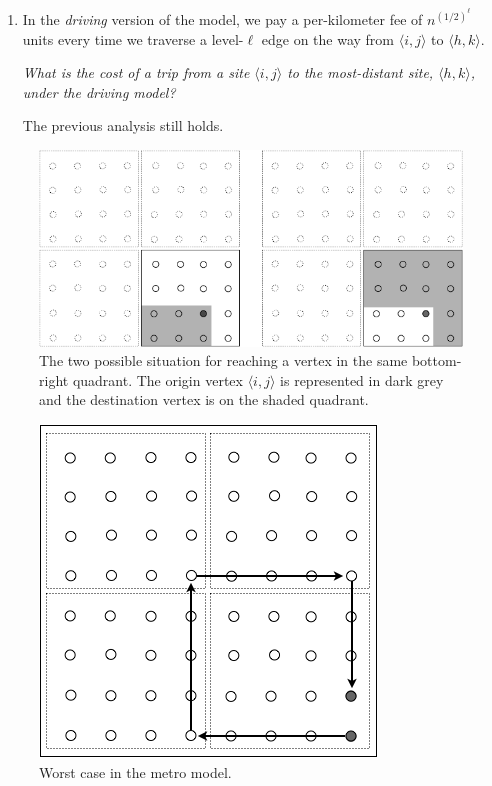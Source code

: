 \begin{itemize}
\begin{enumerate}
  \medskip\item
In the {\em driving} version of the model, we pay a per-kilometer fee of $n^{(1/2)^\ell}$ units every time we traverse a level-$\ell$ edge on the way from $\langle i,j \rangle$ to $\langle h,k \rangle$.
 \smallskip


{\em What is the cost of a trip from a site $\langle i,j \rangle$ to the most-distant site, $\langle h,k \rangle$, under the driving model?}
\smallskip

 The previous analysis still holds. 
 \end{enumerate}
  \begin{figure}[hbt]
\begin{center}
       \includegraphics[scale=0.4]{FiguresGraph/routingWorstCase}
       \caption{The two possible situation for reaching a vertex in the same bottom-right quadrant.
       The origin vertex $\langle i,j \rangle$ is represented in dark grey and the destination vertex is on the shaded quadrant.}
  \label{fig:routingWorstCase}
\end{center}
\end{figure}

 \begin{figure}[hbt]
\begin{center}
       \includegraphics[scale=0.4]{FiguresGraph/routingCitySolution}
       \caption{Worst case in the metro model.}
  \label{fig:routingCitySolution}
\end{center}
\end{figure}


\end{itemize}
